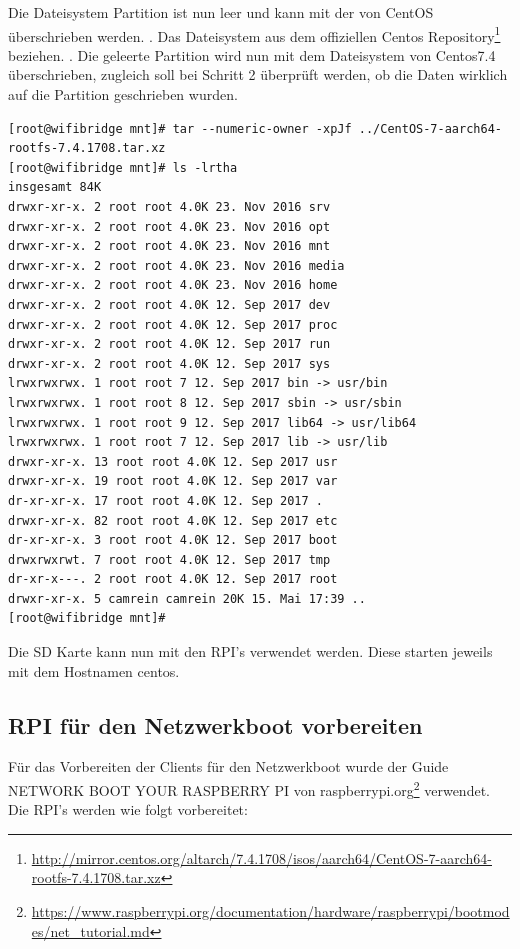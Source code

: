 Die Dateisystem Partition ist nun leer und kann mit der von CentOS überschrieben werden. . Das Dateisystem aus dem offiziellen Centos Repository\footnote{\url{http://mirror.centos.org/altarch/7.4.1708/isos/aarch64/CentOS-7-aarch64-rootfs-7.4.1708.tar.xz}} beziehen. . Die geleerte Partition wird nun mit dem Dateisystem von Centos7.4 überschrieben, zugleich soll bei Schritt 2 überprüft werden, ob die Daten wirklich auf die Partition geschrieben wurden.
\begin{lstlisting}
[root@wifibridge mnt]# tar --numeric-owner -xpJf ../CentOS-7-aarch64-rootfs-7.4.1708.tar.xz
[root@wifibridge mnt]# ls -lrtha
insgesamt 84K
drwxr-xr-x. 2 root root 4.0K 23. Nov 2016 srv
drwxr-xr-x. 2 root root 4.0K 23. Nov 2016 opt
drwxr-xr-x. 2 root root 4.0K 23. Nov 2016 mnt
drwxr-xr-x. 2 root root 4.0K 23. Nov 2016 media
drwxr-xr-x. 2 root root 4.0K 23. Nov 2016 home
drwxr-xr-x. 2 root root 4.0K 12. Sep 2017 dev
drwxr-xr-x. 2 root root 4.0K 12. Sep 2017 proc
drwxr-xr-x. 2 root root 4.0K 12. Sep 2017 run
drwxr-xr-x. 2 root root 4.0K 12. Sep 2017 sys
lrwxrwxrwx. 1 root root 7 12. Sep 2017 bin -> usr/bin
lrwxrwxrwx. 1 root root 8 12. Sep 2017 sbin -> usr/sbin
lrwxrwxrwx. 1 root root 9 12. Sep 2017 lib64 -> usr/lib64
lrwxrwxrwx. 1 root root 7 12. Sep 2017 lib -> usr/lib
drwxr-xr-x. 13 root root 4.0K 12. Sep 2017 usr
drwxr-xr-x. 19 root root 4.0K 12. Sep 2017 var
dr-xr-xr-x. 17 root root 4.0K 12. Sep 2017 .
drwxr-xr-x. 82 root root 4.0K 12. Sep 2017 etc
dr-xr-xr-x. 3 root root 4.0K 12. Sep 2017 boot
drwxrwxrwt. 7 root root 4.0K 12. Sep 2017 tmp
dr-xr-x---. 2 root root 4.0K 12. Sep 2017 root
drwxr-xr-x. 5 camrein camrein 20K 15. Mai 17:39 ..
[root@wifibridge mnt]#
\end{lstlisting}

Die SD Karte kann nun mit den RPI's verwendet werden. Diese starten jeweils mit dem Hostnamen centos.


\subsection{RPI für den Netzwerkboot vorbereiten}
Für das Vorbereiten der Clients für den Netzwerkboot wurde der Guide NETWORK BOOT YOUR RASPBERRY PI von raspberrypi.org\footnote{\url{https://www.raspberrypi.org/documentation/hardware/raspberrypi/bootmodes/net\_tutorial.md}} verwendet. Die RPI's werden wie folgt vorbereitet:

